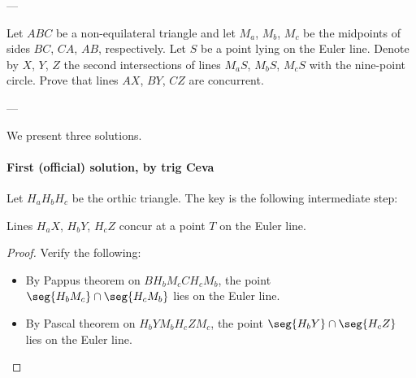 
---

Let $ABC$ be a non-equilateral triangle and let $M_a$, $M_b$, $M_c$ be the midpoints of sides $BC$, $CA$, $AB$, respectively. Let $S$ be a point lying on the Euler line. Denote by $X$, $Y$, $Z$ the second intersections of lines $M_aS$, $M_bS$, $M_cS$ with the nine-point circle. Prove that lines $AX$, $BY$, $CZ$ are concurrent.

---

We present three solutions.

\paragraph{First (official) solution, by trig Ceva} Let $H_aH_bH_c$ be the orthic triangle. The key is the following intermediate step:
\begin{claim*}
    Lines $H_aX$, $H_bY$, $H_cZ$ concur at a point $T$ on the Euler line.
\end{claim*}
\begin{proof}
    Verify the following:
    \begin{itemize}[itemsep=0em]
        \item By Pappus theorem on $BH_bM_cCH_cM_b$, the point $\seg{H_bM_c}\cap\seg{H_cM_b}$ lies on the Euler line.
        \item By Pascal theorem on $H_bYM_bH_cZM_c$, the point $\seg{H_bY}\cap\seg{H_cZ}$ lies on the Euler line.
    \end{itemize}
\end{proof}
